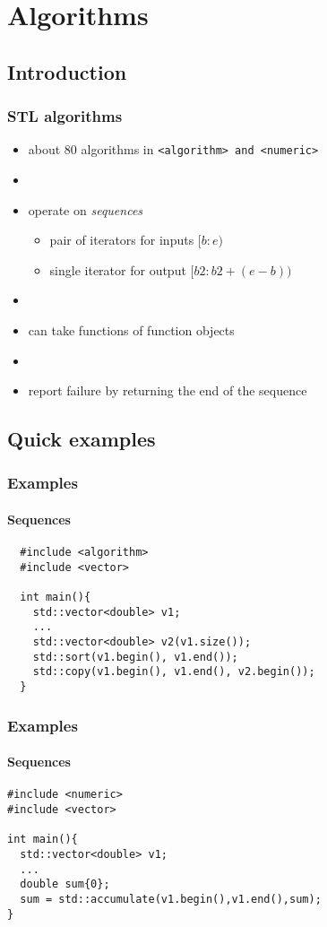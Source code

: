 \section{Algorithms}
\subsection{Introduction}
\begin{frame}
  \frametitle{STL algorithms}
  \begin{itemize}
  \item about 80 algorithms in \texttt{<algorithm> and <numeric>}
  \item[]
  \item operate on \emph{sequences}
    \begin{itemize}
    \item pair of iterators for inputs $[b:e)$
    \item single iterator for output $[b2: b2+(e-b))$
    \end{itemize}
  \item[]
  \item can take functions of function objects
  \item[]
  \item report failure by returning the end of the sequence
  \end{itemize}
\end{frame}
\subsection{Quick examples}
\begin{frame}[fragile]
  \frametitle{Examples}
  \framesubtitle{Sequences}
\begin{lstlisting}
  #include <algorithm>
  #include <vector>
  
  int main(){
    std::vector<double> v1;
    ...
    std::vector<double> v2(v1.size());
    std::sort(v1.begin(), v1.end());
    std::copy(v1.begin(), v1.end(), v2.begin());
  }
\end{lstlisting}
\end{frame}

\begin{frame}[fragile]
  \frametitle{Examples}
  \framesubtitle{Sequences}
\begin{lstlisting}
#include <numeric>
#include <vector>
  
int main(){
  std::vector<double> v1;
  ...
  double sum{0};
  sum = std::accumulate(v1.begin(),v1.end(),sum);
}
\end{lstlisting}
\end{frame}


